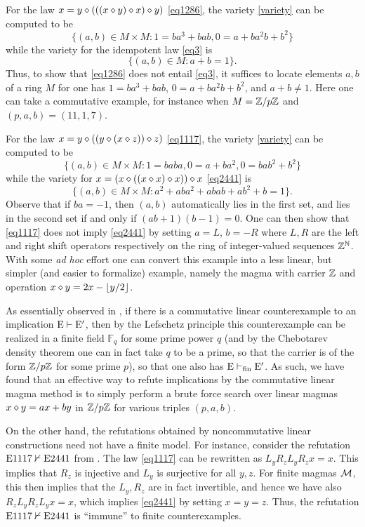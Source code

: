 \begin{example}\label{1286-ex} For the law $x = y \diamond (((x \diamond y) \diamond x) \diamond y)$ \eqref{eq1286}, the variety \eqref{variety} can be computed to be
$$ \{ (a,b) \in M \times M: 1 = ba^3+bab, 0 = a + ba^2 b + b^2 \}$$
while the variety for the idempotent law \eqref{eq3} is
$$ \{ (a,b) \in M: a+b=1 \}.$$
Thus, to show that \eqref{eq1286} does not entail \eqref{eq3}, it suffices to locate elements $a,b$ of a ring $M$ for one has $1 = ba^3+bab$, $0 = a + ba^2 b + b^2$, and $a+b \neq 1$.  Here one can take a commutative example, for instance when $M = \mathbb{Z}/p\mathbb{Z}$ and $(p,a,b) = (11,1,7)$.
\end{example}

\begin{example}\label{1117-ex} For the law $x = y \diamond ((y \diamond (x \diamond z)) \diamond z)$ \eqref{eq1117}, the variety \eqref{variety} can be computed to be
$$ \{ (a,b) \in M \times M: 1 = baba, 0 = a+ba^2, 0 = bab^2 + b^2 \}$$
while the variety for $x = (x \diamond ((x \diamond x) \diamond x)) \diamond x$ \eqref{eq2441} is
$$ \{ (a,b) \in M \times M: a^2 + aba^2 + abab + ab^2 + b = 1 \}.$$
Observe that if $ba = -1$, then $(a,b)$ automatically lies in the first set, and lies in the second set if and only if $(ab+1)(b-1) = 0$.  One can then show that \eqref{eq1117} does not imply \eqref{eq2441} by setting $a = L$, $b = -R$ where $L, R$ are the left and right shift operators respectively on the ring of integer-valued sequences $\mathbb{Z}^{\mathbb{N}}$.  With some \emph{ad hoc} effort one can convert this example into a less linear, but simpler (and easier to formalize) example, namely the magma with carrier $\mathbb{Z}$ and operation $x \diamond y = 2x - \lfloor y/2 \rfloor$.
\end{example}

\begin{remark} As essentially observed in \cite{austin}, if there is a commutative linear counterexample to an implication $\mathrm{E} \vdash {\mathrm{E}'}$, then by the Lefschetz principle this counterexample can be realized in a finite field ${\mathbb F}_q$ for some prime power $q$ (and by the Chebotarev density theorem one can in fact take $q$ to be a prime, so that the carrier is of the form $\mathbb{Z}/p\mathbb{Z}$ for some prime $p$), so that one also has $\mathrm{E} \vdash_{\mathrm{fin}} {\mathrm{E}'}$.  As such, we have found that an effective way to refute implications by the commutative linear magma method is to simply perform a brute force search over linear magmas $x \diamond y = ax + by$ in $\mathbb{Z}/p\mathbb{Z}$ for various triples $(p,a,b)$.

On the other hand, the refutations obtained by noncommutative linear constructions need not have a finite model.  For instance, consider the refutation $\mathrm{E}1117 \nvdash \mathrm{E}2441$ from .  The law \eqref{eq1117} can be rewritten as $L_y R_z L_y R_z x = x$.  This implies that $R_z$ is injective and $L_y$ is surjective for all $y,z$.  For finite magmas ${\mathcal{M}}$, this then implies that the $L_y, R_z$ are in fact invertible, and hence we have also $R_z L_y R_z L_y x = x$, which implies \eqref{eq2441} by setting $x=y=z$.  Thus, the refutation $\mathrm{E}1117 \nvdash \mathrm{E}2441$ is ``immune'' to finite counterexamples.
\end{remark}

